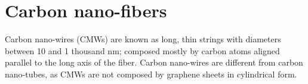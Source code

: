 \section{Carbon nano-fibers}
Carbon nano-wires (CMWs) are known as long, thin strings with diameters between 10 and 1 thousand nm; composed mostly by carbon atoms aligned parallel to the long axis of the fiber. \cite{Nataraj2012} Carbon nano-wires are different from carbon nano-tubes, as CMWs are not composed by graphene sheets in cylindrical form. \cite{Nataraj2012}






